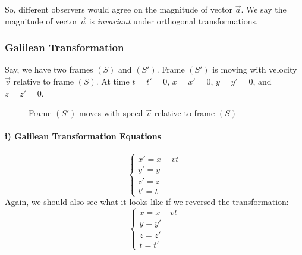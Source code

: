 \documentclass[a4paper,11pt]{article}
\numberwithin{equation}{section}
\begin{document}
  \noindent So, different observers would agree on the magnitude of vector $\vec{a}$. We say the magnitude of vector $\vec{a}$ is \textit{invariant} under orthogonal transformations. 
 
 \subsubsection{Galilean Transformation}
 Say, we have two frames $(S)$ and $(S')$. Frame $(S')$ is moving with velocity $\vec{v}$ relative to frame $(S)$. At time $t=t'=0$, $x=x'=0$, $y=y'=0$, and $z=z'=0$. 
 \begin{figure}[!hbt] %
  \centering
    \caption{Frame $(S')$ moves with speed $\vec{v}$ relative to frame $(S)$}
    \label{fig: galilean}
  \end{figure}
 
 \paragraph{\indent i) Galilean Transformation Equations}
  \begin{equation} \label{eq:9}
  \begin{cases} 
    x'=x-vt \\ 
    y'=y\\
    z'=z\\
    t'=t
  \end{cases}
  \end{equation}
 \noindent Again, we should also see what it looks like if we reversed the transformation:
  \begin{equation} \label{eq:10}
  \begin{cases} 
    x=x+vt \\ 
    y=y'\\
    z=z'\\
    t=t'
  \end{cases}
  \end{equation}
  
\end{document}
